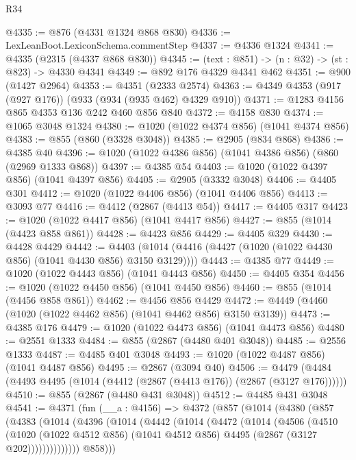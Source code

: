 \begin{lexlean}{R34}
\begin{coremodule}
@4335 := @876 (@4331 @1324 @868 @830)
@4336 := LexLeanBoot.LexiconSchema.commentStep
@4337 := @4336 @1324
@4341 := @4335 (@2315 (@4337 @868 @830))
@4345 := (text : @851) -> (n : @32) -> (st : @823) -> @4330 @4341
@4349 := @892 @176 @4329 @4341 @462
@4351 := @900 (@1427 @2964)
@4353 := @4351 (@2333 @2574)
@4363 := @4349 @4353 (@917 (@927 @176)) (@933 (@934 (@935 @462) @4329 @910))
@4371 := @1283 @4156 @865 @4353 @136 @242 @460 @856 @840
@4372 := @4158 @830
@4374 := @1065 @3048 @1324
@4380 := @1020 (@1022 @4374 @856) (@1041 @4374 @856)
@4383 := @855 (@860 (@3328 @3048))
@4385 := @2905 (@834 @868)
@4386 := @4385 @40
@4396 := @1020 (@1022 @4386 @856) (@1041 @4386 @856) (@860 (@2969 @1333 @868))
@4397 := @4385 @54
@4403 := @1020 (@1022 @4397 @856) (@1041 @4397 @856)
@4405 := @2905 (@3332 @3048)
@4406 := @4405 @301
@4412 := @1020 (@1022 @4406 @856) (@1041 @4406 @856)
@4413 := @3093 @77
@4416 := @4412 (@2867 (@4413 @54))
@4417 := @4405 @317
@4423 := @1020 (@1022 @4417 @856) (@1041 @4417 @856)
@4427 := @855 (@1014 (@4423 @858 @861))
@4428 := @4423 @856
@4429 := @4405 @329
@4430 := @4428 @4429
@4442 := @4403 (@1014 (@4416 (@4427 (@1020 (@1022 @4430 @856) (@1041 @4430 @856) @3150 @3129))))
@4443 := @4385 @77
@4449 := @1020 (@1022 @4443 @856) (@1041 @4443 @856)
@4450 := @4405 @354
@4456 := @1020 (@1022 @4450 @856) (@1041 @4450 @856)
@4460 := @855 (@1014 (@4456 @858 @861))
@4462 := @4456 @856 @4429
@4472 := @4449 (@4460 (@1020 (@1022 @4462 @856) (@1041 @4462 @856) @3150 @3139))
@4473 := @4385 @176
@4479 := @1020 (@1022 @4473 @856) (@1041 @4473 @856)
@4480 := @2551 @1333
@4484 := @855 (@2867 (@4480 @401 @3048))
@4485 := @2556 @1333
@4487 := @4485 @401 @3048
@4493 := @1020 (@1022 @4487 @856) (@1041 @4487 @856)
@4495 := @2867 (@3094 @40)
@4506 := @4479 (@4484 (@4493 @4495 (@1014 (@4412 (@2867 (@4413 @176)) (@2867 (@3127 @176))))))
@4510 := @855 (@2867 (@4480 @431 @3048))
@4512 := @4485 @431 @3048
@4541 := @4371
    (fun (__a : @4156) =>
    @4372
      (@857
        (@1014
          (@4380
            (@857
              (@4383
                (@1014
                  (@4396
                    (@1014
                      (@4442
                        (@1014
                          (@4472
                            (@1014
                              (@4506
                                (@4510
                                  (@1020
                                    (@1022 @4512 @856)
                                    (@1041 @4512 @856)
                                    @4495
                                    (@2867 (@3127 @202))))))))))))))
            @858)))

\end{coremodule}
\end{lexlean}
